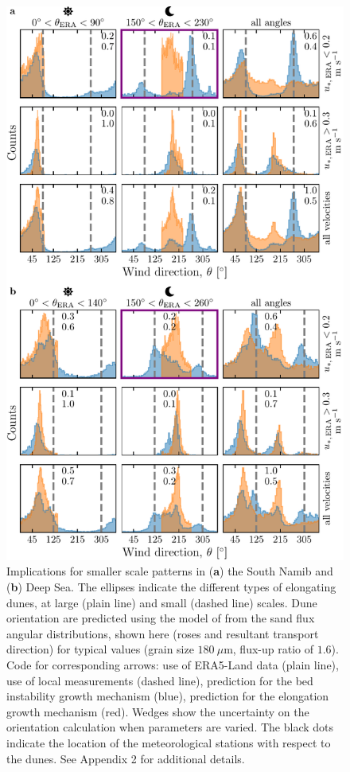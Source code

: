 \begin{figure}
\centering
\includegraphics[scale=1]{Figures/Figure6.pdf}
\caption{Implications for smaller scale patterns in (\textbf{a}) the South Namib and (\textbf{b}) Deep Sea. The ellipses indicate the different types of elongating dunes, at large (plain line) and small (dashed line) scales. Dune orientation are predicted using the model of \citet{Courrech2014} from the sand flux angular distributions, shown here (roses and resultant transport direction) for typical values (grain size $180~\mu$m, flux-up ratio of $1.6$). Code for corresponding arrows: use of ERA5-Land data (plain line), use of local measurements (dashed line), prediction for the bed instability growth mechanism (blue), prediction for the elongation growth mechanism (red). Wedges show the uncertainty on the orientation calculation when parameters are varied. The black dots indicate the location of the meteorological stations with respect to the dunes. See Appendix 2 for additional details.}
\label{Fig6}
\end{figure}


